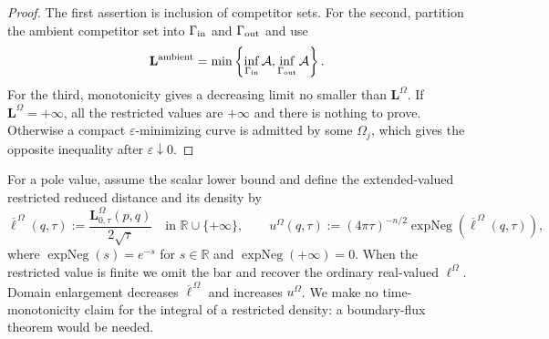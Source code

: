 \documentclass[10pt]{coll-l}
\theoremstyle{definition}
\theoremstyle{remark}
\numberwithin{section}{chapter}
\numberwithin{equation}{chapter}
\begin{document}
\begin{proof}
The first assertion is inclusion of competitor sets.  For the second,
partition the ambient competitor set into $\Gamma_{\rm in}$ and
$\Gamma_{\rm out}$ and use
\begin{equation}
 \mathbf L^{\rm ambient}
 =\min\left\{\inf_{\Gamma_{\rm in}}\mathcal A,
              \inf_{\Gamma_{\rm out}}\mathcal A\right\}.
                                                               \label{eq:red-domain-partition}
\end{equation}
For the third, monotonicity gives a decreasing limit no smaller than
$\mathbf L^\Omega$.  If $\mathbf L^\Omega=+\infty$, all the restricted
values are $+\infty$ and there is nothing to prove.  Otherwise a compact
$\varepsilon$-minimizing curve is admitted by some $\Omega_j$, which gives
the opposite inequality after $\varepsilon\downarrow0$.
\end{proof}

For a pole value, assume the scalar lower bound and define the
extended-valued restricted reduced distance and its density by
\begin{equation}
 \overline\ell^{\,\Omega}(q,\tau)
   :=\frac{\mathbf L^{\Omega}_{0,\tau}(p,q)}{2\sqrt\tau}
       \quad\text{in }\mathbb R\cup\{+\infty\},
 \qquad
 u^\Omega(q,\tau)
   :=(4\pi\tau)^{-n/2}\operatorname{expNeg}\!\left(
                    \overline\ell^{\,\Omega}(q,\tau)\right),  \label{eq:red-restricted-density}
\end{equation}
where $\operatorname{expNeg}(s)=e^{-s}$ for $s\in\mathbb R$ and
$\operatorname{expNeg}(+\infty)=0$.  When the restricted value is finite we omit the bar
and recover the ordinary real-valued $\ell^\Omega$.  Domain enlargement
decreases $\overline\ell^{\,\Omega}$ and increases $u^\Omega$.  We make no
time-monotonicity claim for the integral of a restricted density: a
boundary-flux theorem would be needed.
\end{document}
